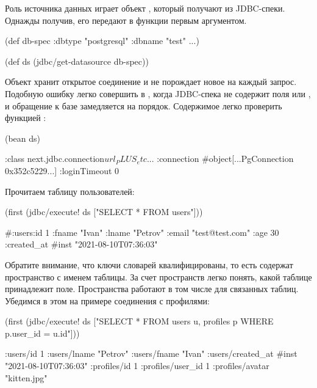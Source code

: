 Роль источника данных играет объект , который получают из JDBC-спеки. Однажды получив, его передают в функции первым аргументом.

\begin{english}
  \begin{clojure}
(def db-spec {:dbtype "postgresql" :dbname "test" ...})

(def ds (jdbc/get-datasource db-spec))
  \end{clojure}
\end{english}

Объект  хранит открытое соединение и не порождает новое на каждый запрос. Подобную ошибку легко совершить в , когда JDBC-спека не содержит поля  или , и обращение к базе замедляется на порядок. Содержимое  легко проверить функцией :

\begin{english}
  \begin{clojure}
(bean ds)

{:class next.jdbc.connection$url_PLUS_etc$...
 :connection #object[...PgConnection 0x352c5229...]
 :loginTimeout 0}
  \end{clojure}
\end{english}

Прочитаем таблицу пользователей:

\begin{english}
  \begin{clojure}
(first (jdbc/execute! ds ["SELECT * FROM users"]))

#:users{:id 1
        :fname "Ivan"
        :lname "Petrov"
        :email "test@test.com"
        :age 30
        :created_at #inst "2021-08-10T07:36:03"}
  \end{clojure}
\end{english}

Обратите внимание, что ключи словарей квалифицированы, то есть содержат пространство с именем таблицы. За счет пространств легко понять, какой таблице принадлежит поле. Пространства работают в том числе для связанных таблиц. Убедимся в этом на примере соединения с профилями:

\begin{english}
  \begin{clojure}
(first
  (jdbc/execute! ds
    ["SELECT *
      FROM users u, profiles p
      WHERE p.user_id = u.id"]))

{:users/id 1
 :users/lname "Petrov"
 :users/fname "Ivan"
 :users/created_at #inst "2021-08-10T07:36:03"
 :profiles/id 1
 :profiles/user_id 1
 :profiles/avatar "kitten.jpg"}
  \end{clojure}
\end{english}


